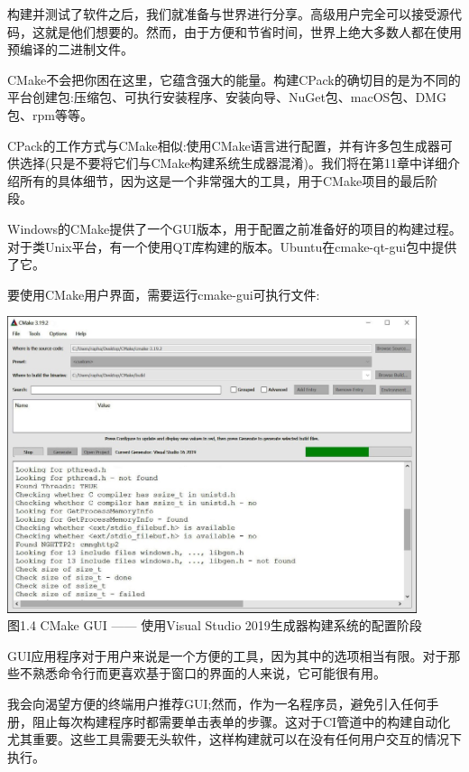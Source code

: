
构建并测试了软件之后，我们就准备与世界进行分享。高级用户完全可以接受源代码，这就是他们想要的。然而，由于方便和节省时间，世界上绝大多数人都在使用预编译的二进制文件。

CMake不会把你困在这里，它蕴含强大的能量。构建CPack的确切目的是为不同的平台创建包:压缩包、可执行安装程序、安装向导、NuGet包、macOS包、DMG包、rpm等等。

CPack的工作方式与CMake相似:使用CMake语言进行配置，并有许多包生成器可供选择(只是不要将它们与CMake构建系统生成器混淆)。我们将在第11章中详细介绍所有的具体细节，因为这是一个非常强大的工具，用于CMake项目的最后阶段。


Windows的CMake提供了一个GUI版本，用于配置之前准备好的项目的构建过程。对于类Unix平台，有一个使用QT库构建的版本。Ubuntu在cmake-qt-gui包中提供了它。

要使用CMake用户界面，需要运行cmake-gui可执行文件:

\begin{center}
\includegraphics[width=0.9\textwidth]{content/1/chapter1/images/4.jpg}\\
图1.4  CMake GUI —— 使用Visual Studio 2019生成器构建系统的配置阶段
\end{center}

GUI应用程序对于用户来说是一个方便的工具，因为其中的选项相当有限。对于那些不熟悉命令行而更喜欢基于窗口的界面的人来说，它可能很有用。

\begin{tcolorbox}[colback=red!5!white,colframe=red!75!black,title=不推荐]
我会向渴望方便的终端用户推荐GUI;然而，作为一名程序员，避免引入任何手册，阻止每次构建程序时都需要单击表单的步骤。这对于CI管道中的构建自动化尤其重要。这些工具需要无头软件，这样构建就可以在没有任何用户交互的情况下执行。
\end{tcolorbox}

